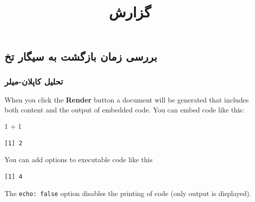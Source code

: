 \documentclass[
  letterpaper,
  DIV=11,
  numbers=noendperiod]{scrartcl}
\title{گزارش}
\author{}
\date{}
\newenvironment{Shaded}{\begin{snugshade}}{\end{snugshade}}
\newcommand{\DecValTok}[1]{\textcolor[rgb]{0.68,0.00,0.00}{#1}}
\newcommand{\SpecialCharTok}[1]{\textcolor[rgb]{0.37,0.37,0.37}{#1}}
\begin{document}
\maketitle


\subsection{بررسی زمان بازگشت به سیگار
تخ}\label{ux628ux631ux631ux633ux6cc-ux632ux645ux627ux646-ux628ux627ux632ux6afux634ux62a-ux628ux647-ux633ux6ccux6afux627ux631-ux62aux62e}

\subsubsection{تحلیل
کاپلان-میلر}\label{ux62aux62dux644ux6ccux644-ux6a9ux627ux67eux644ux627ux646-ux645ux6ccux644ux631}

When you click the \textbf{Render} button a document will be generated
that includes both content and the output of embedded code. You can
embed code like this:

\begin{Shaded}
\begin{Highlighting}[]
\DecValTok{1} \SpecialCharTok{+} \DecValTok{1}
\end{Highlighting}
\end{Shaded}

\begin{verbatim}
[1] 2
\end{verbatim}

You can add options to executable code like this

\begin{verbatim}
[1] 4
\end{verbatim}

The \texttt{echo:\ false} option disables the printing of code (only
output is displayed).
\end{document}
